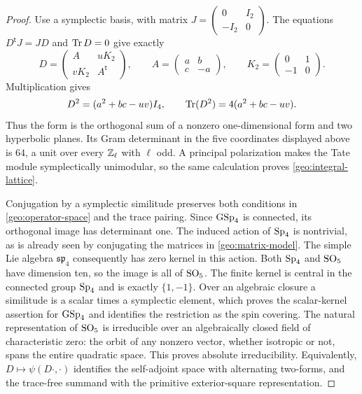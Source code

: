\begin{proof}
Use a symplectic basis, with matrix
$J=\left(\begin{smallmatrix}0&I_2\\-I_2&0\end{smallmatrix}\right)$.
The equations $D^{\mathsf t}J=JD$ and $\operatorname{Tr} D=0$ give exactly
\begin{equation}\label{geo:matrix-model}
 D=\begin{pmatrix}A&uK_2\\vK_2&A^{\mathsf t}\end{pmatrix},
 \qquad
 A=\begin{pmatrix}a&b\\c&-a\end{pmatrix},
 \qquad K_2=\begin{pmatrix}0&1\\-1&0\end{pmatrix}.
\end{equation}
Multiplication gives
\begin{equation}\label{geo:trace-form}
 D^2=(a^2+bc-uv)I_4,
 \qquad \operatorname{Tr}(D^2)=4(a^2+bc-uv).
\end{equation}
Thus the form is the orthogonal sum of a nonzero one-dimensional
form and two hyperbolic planes.  Its Gram determinant in the five
coordinates displayed above is $64$, a unit over every $\mathbb Z_\ell$
with $\ell$ odd.  A principal polarization makes the Tate module
symplectically unimodular, so the same calculation proves
\eqref{geo:integral-lattice}.

Conjugation by a symplectic similitude preserves both conditions in
\eqref{geo:operator-space} and the trace pairing.  Since $\operatorname{GSp}_4$ is
connected, its orthogonal image has determinant one.  The induced
action of $\operatorname{Sp}_4$ is nontrivial, as is already seen by conjugating the
matrices in \eqref{geo:matrix-model}.  The simple Lie algebra
$\mathfrak{sp}_4$ consequently has zero kernel in this action.  Both
$\operatorname{Sp}_4$ and $\operatorname{SO}_5$ have dimension ten, so the image is all of
$\operatorname{SO}_5$.  The finite kernel is central in the connected group
$\operatorname{Sp}_4$ and is exactly $\{1,-1\}$.  Over an algebraic closure a
similitude is a scalar times a symplectic element, which proves the
scalar-kernel assertion for $\operatorname{GSp}_4$ and identifies the restriction
as the spin covering.  The natural representation of $\operatorname{SO}_5$ is
irreducible over an algebraically closed field of characteristic
zero: the orbit of any nonzero vector, whether isotropic or not,
spans the entire quadratic space.  This proves absolute
irreducibility.  Equivalently, $D\mapsto\psi(D\cdot,\cdot)$
identifies the self-adjoint space with alternating two-forms, and
the trace-free summand with the primitive exterior-square
representation.


\end{proof}
